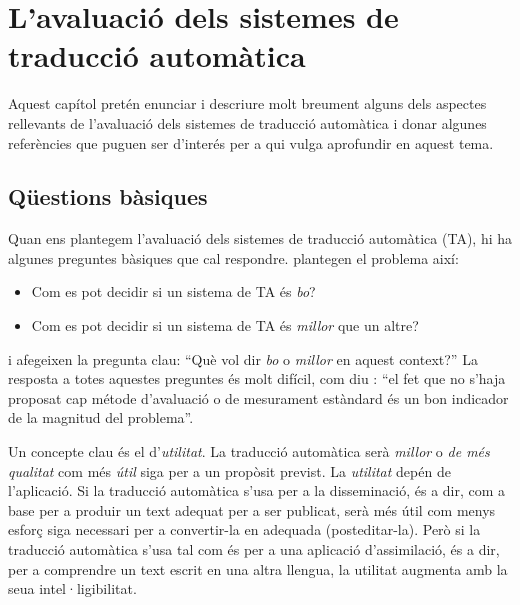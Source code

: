 \chapter[Avaluació de la traducció automàtica]{L'avaluació dels sistemes de traducció
  automàtica}
\label{se:ASTA}














Aquest capítol pretén enunciar i descriure molt breument
alguns dels aspectes rellevants de l'avaluació dels sistemes de
traducció automàtica i donar algunes referències que
puguen ser d'interés per a qui vulga aprofundir en aquest tema.

\section{Qüestions bàsiques} 
Quan ens plantegem l'avaluació dels sistemes de traducció automàtica
(TA), hi ha algunes preguntes bàsiques que cal
respondre. \citet{arnold94b} plantegen el problema així:
\begin{itemize}
\item Com es pot decidir si un sistema de TA és \emph{bo}?
\item Com es pot decidir si un sistema de TA és \emph{millor} que
  un altre?
\end{itemize}
i afegeixen la pregunta clau: ``Què vol dir \emph{bo} o \emph{millor}
en aquest context?'' La resposta a totes aquestes preguntes és molt
difícil, com diu \citet{minnis94j}: ``el fet que no s'haja proposat
cap métode d'avaluació o de mesurament estàndard és un bon indicador
de la magnitud del problema''.

Un concepte clau és el d'\emph{utilitat}. La traducció automàtica serà
\emph{millor} o \emph{de més qualitat} com més \emph{útil} siga per a
un propòsit previst. La \emph{utilitat} depén de l'aplicació. Si la
traducció automàtica s'usa per a la disseminació, és a dir, com a base
per a produir un text adequat per a ser publicat, serà més útil com
menys esforç siga necessari per a convertir-la en adequada
(posteditar-la). Però si la traducció automàtica s'usa tal com és per
a una aplicació d'assimilació, és a dir, per a comprendre un text
escrit en una altra llengua, la utilitat augmenta amb la seua
intel·ligibilitat.

